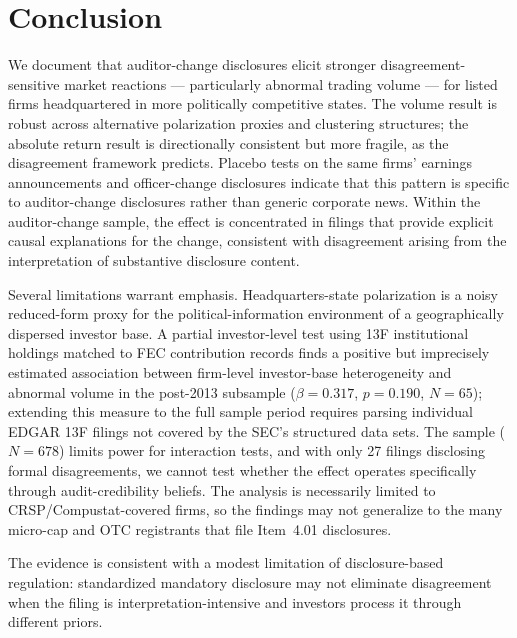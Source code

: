 \documentclass[12pt]{article}
\begin{document}
\section{Conclusion}
\label{sec:conclusion}

We document that auditor-change disclosures elicit stronger
disagreement-sensitive market reactions --- particularly abnormal trading
volume --- for listed firms headquartered in more politically competitive
states. The volume result is robust across alternative polarization
proxies and clustering structures; the absolute return result is
directionally consistent but more fragile, as the disagreement framework
predicts. Placebo tests on the same firms' earnings announcements and
officer-change disclosures indicate that this pattern is specific to
auditor-change disclosures rather than generic corporate news. Within the
auditor-change sample, the effect is concentrated in filings that provide
explicit causal explanations for the change, consistent with disagreement
arising from the interpretation of substantive disclosure content.

Several limitations warrant emphasis. Headquarters-state polarization is
a noisy reduced-form proxy for the political-information environment of
a geographically dispersed investor base. A partial investor-level test
using 13F institutional holdings matched to FEC contribution records
finds a positive but imprecisely estimated association between
firm-level investor-base heterogeneity and abnormal volume in the
post-2013 subsample ($\beta = 0.317$, $p = 0.190$, $N = 65$);
extending this measure to the full sample period requires parsing
individual EDGAR 13F filings not covered by the SEC's structured data
sets. The sample ($N = 678$) limits power for interaction tests,
and with only 27 filings disclosing formal disagreements, we cannot test
whether the effect operates specifically through audit-credibility
beliefs. The analysis is necessarily limited to CRSP/Compustat-covered
firms, so the findings may not generalize to the many micro-cap and OTC
registrants that file Item~4.01 disclosures.

The evidence is consistent with a modest limitation of disclosure-based
regulation: standardized mandatory disclosure may not eliminate
disagreement when the filing is interpretation-intensive and investors
process it through different priors.




\end{document}
